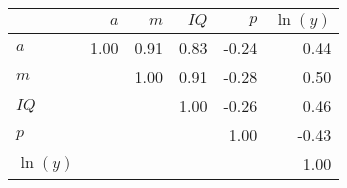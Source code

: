 \begin{tabular}{lrrrrr}
\hline
 & $a$  & $m$  & $IQ$  & $p$  & $\ln(y)$  \\
\hline
$a$ & 1.00  & 0.91  & 0.83  & -0.24  & 0.44  \\
$m$ &   & 1.00  & 0.91  & -0.28  & 0.50  \\
$IQ$ &   &   & 1.00  & -0.26  & 0.46  \\
$p$ &   &   &   & 1.00  & -0.43  \\
$\ln(y)$ &   &   &   &   & 1.00  \\
\hline
\end{tabular}%
